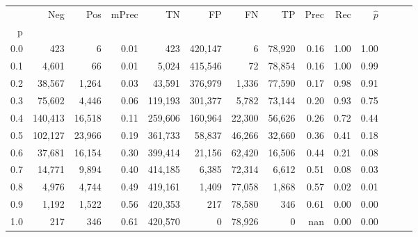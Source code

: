 \begin{tabular}{rrrrrrrrrrrrrr}
\toprule
{} &      Neg &     Pos & mPrec &       TN &       FP &      FN &      TP &  Prec &   Rec & $\hat{p}$ \\
p   &          &         &       &          &          &         &         &       &       &           \\
\midrule
0.0 &      423 &       6 &  0.01 &      423 &  420,147 &       6 &  78,920 &  0.16 &  1.00 &      1.00 \\
0.1 &    4,601 &      66 &  0.01 &    5,024 &  415,546 &      72 &  78,854 &  0.16 &  1.00 &      0.99 \\
0.2 &   38,567 &   1,264 &  0.03 &   43,591 &  376,979 &   1,336 &  77,590 &  0.17 &  0.98 &      0.91 \\
0.3 &   75,602 &   4,446 &  0.06 &  119,193 &  301,377 &   5,782 &  73,144 &  0.20 &  0.93 &      0.75 \\
0.4 &  140,413 &  16,518 &  0.11 &  259,606 &  160,964 &  22,300 &  56,626 &  0.26 &  0.72 &      0.44 \\
0.5 &  102,127 &  23,966 &  0.19 &  361,733 &   58,837 &  46,266 &  32,660 &  0.36 &  0.41 &      0.18 \\
0.6 &   37,681 &  16,154 &  0.30 &  399,414 &   21,156 &  62,420 &  16,506 &  0.44 &  0.21 &      0.08 \\
0.7 &   14,771 &   9,894 &  0.40 &  414,185 &    6,385 &  72,314 &   6,612 &  0.51 &  0.08 &      0.03 \\
0.8 &    4,976 &   4,744 &  0.49 &  419,161 &    1,409 &  77,058 &   1,868 &  0.57 &  0.02 &      0.01 \\
0.9 &    1,192 &   1,522 &  0.56 &  420,353 &      217 &  78,580 &     346 &  0.61 &  0.00 &      0.00 \\
1.0 &      217 &     346 &  0.61 &  420,570 &        0 &  78,926 &       0 &   nan &  0.00 &      0.00 \\
\bottomrule
\end{tabular}
